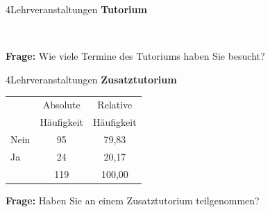 \documentclass[xcolor=table,9pt,aspectratio=169]{beamer}
\begin{document}
\begin{frame}{\vspace*{10mm}4\hspace*{1em}Lehrveranstaltungen}
\textbf{Tutorium}\\

\smallskip
\begin{center}
   \\
\end{center}

\bigskip
\textbf{Frage:} Wie viele Termine des Tutoriums haben Sie besucht?
\end{frame}


\begin{frame}{\vspace*{10mm}4\hspace*{1em}Lehrveranstaltungen}
\textbf{Zusatztutorium}\\

\medskip
\begin{tabular}{lcc}
   \arrayrulecolor{blue2}\hline
          & Absolute     & Relative     \\
          & Häufigkeit   & Häufigkeit   \\
   \hline\hline
   Nein   &  95          &  79,83       \\
   Ja     &  24          &  20,17       \\
   \hline
          & 119          & 100,00       \\
   \hline
\end{tabular}

\bigskip
\textbf{Frage:} Haben Sie an einem Zusatztutorium teilgenommen?
\end{frame}
\end{document}
